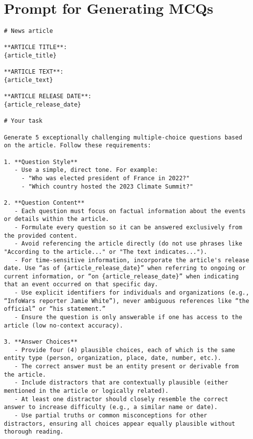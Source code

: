 \documentclass[11pt]{article}
\begin{document}
\clearpage

\section{Prompt for Generating MCQs}
\label{app:mcq-prompt}

\begin{lstlisting}[basicstyle=\ttfamily\small,breaklines=true]
# News article

**ARTICLE TITLE**:
{article_title}

**ARTICLE TEXT**:
{article_text}

**ARTICLE RELEASE DATE**:
{article_release_date}

# Your task

Generate 5 exceptionally challenging multiple-choice questions based on the article. Follow these requirements:

1. **Question Style**  
   - Use a simple, direct tone. For example:  
     - "Who was elected president of France in 2022?"  
     - "Which country hosted the 2023 Climate Summit?"  

2. **Question Content**  
   - Each question must focus on factual information about the events or details within the article.  
   - Formulate every question so it can be answered exclusively from the provided content.  
   - Avoid referencing the article directly (do not use phrases like "According to the article..." or "The text indicates...").  
   - For time-sensitive information, incorporate the article's release date. Use “as of {article_release_date}” when referring to ongoing or current information, or “on {article_release_date}” when indicating that an event occurred on that specific day.  
   - Use explicit identifiers for individuals and organizations (e.g., “InfoWars reporter Jamie White”), never ambiguous references like “the official” or “his statement.”  
   - Ensure the question is only answerable if one has access to the article (low no-context accuracy).  

3. **Answer Choices**  
   - Provide four (4) plausible choices, each of which is the same entity type (person, organization, place, date, number, etc.).  
   - The correct answer must be an entity present or derivable from the article.  
   - Include distractors that are contextually plausible (either mentioned in the article or logically related).  
   - At least one distractor should closely resemble the correct answer to increase difficulty (e.g., a similar name or date).  
   - Use partial truths or common misconceptions for other distractors, ensuring all choices appear equally plausible without thorough reading.  


\end{lstlisting}
\end{document}
